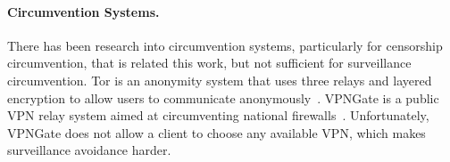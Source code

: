 \paragraph{Circumvention Systems.}  There has been research into
circumvention systems, particularly for censorship circumvention, that
is related this work, but not sufficient for surveillance circumvention.
Tor is an anonymity system that uses three relays and layered encryption
to allow users to communicate anonymously~\cite{dingledine2004tor}.
VPNGate is a public VPN relay system aimed at circumventing national
firewalls~\cite{nobori2014vpn}.  Unfortunately, VPNGate does not allow a
client to choose any available VPN, which makes surveillance avoidance
harder.

